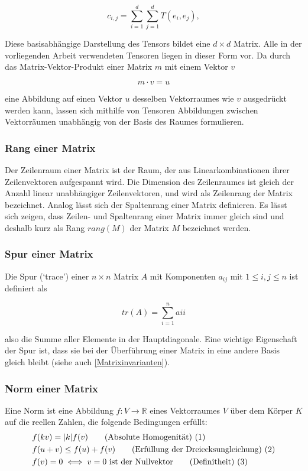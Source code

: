 \documentclass[a4paper,fontsize=12pt,toc=bib,halfparskip]{scrartcl}
\begin{document}
\begin{equation}
	c_{i,j} = \sum_{i=1}^{d} \sum_{j=1}^{d} T(e_i, e_j),  
\end{equation}

Diese basisabh\"angige Darstellung des Tensors bildet eine $d\times d$ Matrix. Alle in der vorliegenden Arbeit verwendeten Tensoren liegen in dieser Form vor. Da durch das Matrix-Vektor-Produkt einer Matrix $m$ mit einem Vektor $v$

\begin{equation}
	m \cdot v = u
\end{equation} 

eine Abbildung auf einen Vektor $u$ desselben Vektorraumes wie $v$ ausgedr\"uckt werden kann, lassen sich mithilfe von Tensoren Abbildungen zwischen Vektorr\"aumen unabh\"angig von der Basis des Raumes formulieren.

\subsubsection{Rang einer Matrix}
Der Zeilenraum einer Matrix ist der Raum, der aus Linearkombinationen ihrer Zeilenvektoren aufgespannt wird. Die Dimension des Zeilenraumes ist gleich der Anzahl linear unabh\"angiger Zeilenvektoren, und wird als Zeilenrang der Matrix bezeichnet. Analog l\"asst sich der Spaltenrang einer Matrix definieren. Es l\"asst sich zeigen, dass Zeilen- und Spaltenrang einer Matrix immer gleich sind und deshalb kurz als Rang $rang(M)$ der Matrix $M$ bezeichnet werden.

\subsubsection{Spur einer Matrix}
Die Spur (`trace') einer $n\times n$ Matrix $A$ mit Komponenten $a_{ij}$ mit $1 \leq i,j \leq n$ ist definiert als

\begin{equation}
	tr(A) = \sum_{i = 1}^{n} a{ii}
\end{equation}

also die Summe aller Elemente in der Hauptdiagonale. Eine wichtige Eigenschaft der Spur ist, dass sie bei der \"Uberf\"uhrung einer Matrix in eine andere Basis gleich bleibt (siehe auch \ref{Matrixinvarianten}).


\subsubsection{Norm einer Matrix}
Eine Norm ist eine Abbildung $f: V \rightarrow \mathbb{R}$ eines Vektorraumes $V$ \"uber dem K\"orper $K$ auf die reellen Zahlen, die folgende Bedingungen erf\"ullt:
\begin{align}
	&f(kv) = |k|f(v) \tag{Absolute Homogenit\"at) (\addtocounter{equation}{1}\theequation}\\
	&f(u+v) \leq f(u) + f(v) \tag{Erf\"ullung der Dreiecksungleichung) (\addtocounter{equation}{1}\theequation}\\
	&f(v) = 0 \iff v=0 \text{ ist der Nullvektor} \tag{Definitheit) (\addtocounter{equation}{1}\theequation}
\end{align}
\end{document}
